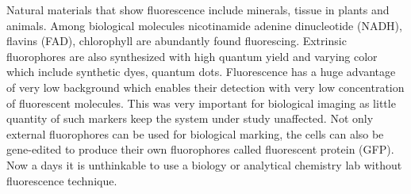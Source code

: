 Natural materials that show fluorescence include minerals, tissue in plants and animals.
Among biological molecules nicotinamide adenine dinucleotide (NADH), flavins (FAD), chlorophyll are abundantly found fluorescing.
Extrinsic fluorophores are also synthesized with high quantum yield and varying color which include synthetic dyes, quantum dots.
Fluorescence has a huge advantage of very low background which enables their detection with very low concentration of fluorescent molecules.
This was very important for biological imaging as little quantity of such markers keep the system under study unaffected.
Not only external fluorophores can be used for biological marking, the cells can also be gene-edited to produce their own fluorophores called fluorescent protein (GFP).
Now a days it is unthinkable to use a biology or analytical chemistry lab without fluorescence technique.

